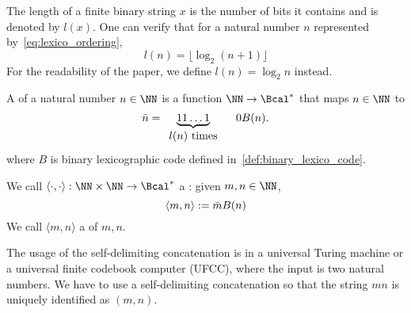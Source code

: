 The length of a finite binary string $x$ is the number of bits it contains and is denoted by $l(x)$. One can verify that for a natural number $n$ represented by~\cref{eq:lexico_ordering}, 
\begin{equation}\label{eq:def_length_number}
    l(n)=\lfloor \log_2 (n + 1) \rfloor
\end{equation}
For the readability of the paper, we define $l(n)=\log_2 n$ instead.
\begin{definition}\label{def:self_delim_code}
    A  of a natural number $n \in \NN$ is a function $\NN\to \Bcal^*$ that maps $n\in\NN$ to
    \begin{equation}
        \Bar{n}=\underbrace{11\dots1}_{\begin{array}{c}l(n)\text{ times}\\\end{array}}\quad 0 B(n).
    \end{equation}
    where $B$ is binary lexicographic code defined in~\cref{def:binary_lexico_code}.
    
    We call $\langle \cdot,\cdot \rangle: \NN \times \NN\to \Bcal^*$ a : given $m,n\in \NN$,
    \begin{equation}
        \langle m,n \rangle := \Bar{m} B(n)
    \end{equation}
    We call $\langle m,n \rangle$ a  of $m,n$.
\end{definition}
The usage of the self-delimiting concatenation is in a universal Turing machine or a universal finite codebook computer (UFCC), where the input is two natural numbers. We have to use a self-delimiting concatenation so that the string $mn$ is uniquely identified as $(m,n)$.

%

